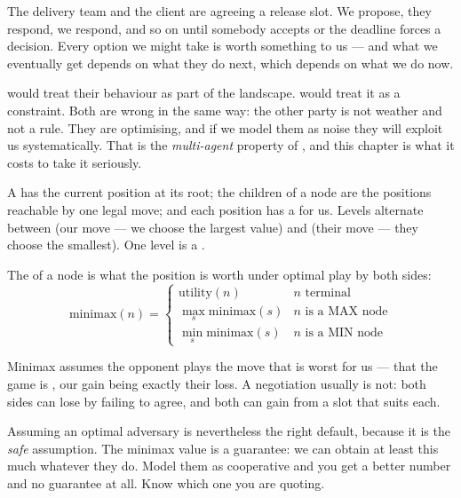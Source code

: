 The delivery team and the client are agreeing a release slot. We propose, they
respond, we respond, and so on until somebody accepts or the deadline forces a
decision. Every option we might take is worth something to us --- and what we
eventually get depends on what they do next, which depends on what we do now.

 would treat their behaviour as part of the landscape. 
would treat it as a constraint. Both are wrong in the same way: the other party is
not weather and not a rule. They are optimising, and if we model them as noise they
will exploit us systematically. That is the \emph{multi-agent} property of
, and this chapter is what it costs to take it seriously.

\begin{definitionbox}
A  has the current position at its root; the children of a node are
the positions reachable by one legal move; and each  position has a
 for us. Levels alternate between  (our move --- we choose
the largest value) and  (their move --- they choose the smallest). One
level is a .

The  of a node is what the position is worth under optimal play
by both sides:
\[
  \mathrm{minimax}(n) =
  \begin{cases}
    \mathrm{utility}(n) & \text{$n$ terminal} \\
    \max_{s} \mathrm{minimax}(s) & \text{$n$ is a MAX node} \\
    \min_{s} \mathrm{minimax}(s) & \text{$n$ is a MIN node}
  \end{cases}
\]
\end{definitionbox}

\begin{alertbox}
Minimax assumes the opponent plays the move that is worst for us --- that the game
is , our gain being exactly their loss. A negotiation usually is not:
both sides can lose by failing to agree, and both can gain from a slot that suits
each.

Assuming an optimal adversary is nevertheless the right default, because it is the
\emph{safe} assumption. The minimax value is a guarantee: we can obtain at least
this much whatever they do. Model them as cooperative and you get a better number
and no guarantee at all. Know which one you are quoting.
\end{alertbox}

